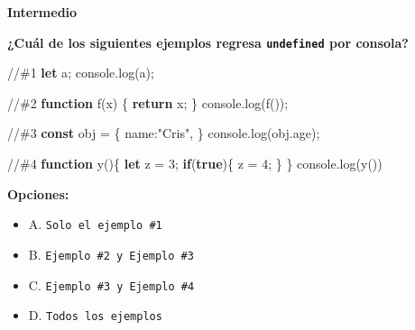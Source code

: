 \documentclass[
  letterpaper,
  DIV=11,
  numbers=noendperiod]{scrreprt}
\newenvironment{Shaded}{\begin{snugshade}}{\end{snugshade}}
\newcommand{\AttributeTok}[1]{\textcolor[rgb]{0.40,0.45,0.13}{#1}}
\newcommand{\BuiltInTok}[1]{\textcolor[rgb]{0.00,0.23,0.31}{#1}}
\newcommand{\CommentTok}[1]{\textcolor[rgb]{0.37,0.37,0.37}{#1}}
\newcommand{\ControlFlowTok}[1]{\textcolor[rgb]{0.00,0.23,0.31}{\textbf{#1}}}
\newcommand{\DataTypeTok}[1]{\textcolor[rgb]{0.68,0.00,0.00}{#1}}
\newcommand{\DecValTok}[1]{\textcolor[rgb]{0.68,0.00,0.00}{#1}}
\newcommand{\FunctionTok}[1]{\textcolor[rgb]{0.28,0.35,0.67}{#1}}
\newcommand{\KeywordTok}[1]{\textcolor[rgb]{0.00,0.23,0.31}{\textbf{#1}}}
\newcommand{\NormalTok}[1]{\textcolor[rgb]{0.00,0.23,0.31}{#1}}
\newcommand{\OperatorTok}[1]{\textcolor[rgb]{0.37,0.37,0.37}{#1}}
\newcommand{\StringTok}[1]{\textcolor[rgb]{0.13,0.47,0.30}{#1}}
\providecommand{\tightlist}{%
  \setlength{\itemsep}{0pt}\setlength{\parskip}{0pt}}
\begin{document}
\begin{tcolorbox}[enhanced jigsaw, left=2mm, toprule=.15mm, leftrule=.75mm, breakable, colback=white, coltitle=black, bottomtitle=1mm, arc=.35mm, rightrule=.15mm, colframe=quarto-callout-caution-color-frame, opacitybacktitle=0.6, toptitle=1mm, opacityback=0, titlerule=0mm, title=\textcolor{quarto-callout-caution-color}{\faFire}\hspace{0.5em}{Dificultad}, bottomrule=.15mm, colbacktitle=quarto-callout-caution-color!10!white]

\textbf{Intermedio}

\end{tcolorbox}

\textbf{¿Cuál de los siguientes ejemplos regresa \texttt{undefined} por
consola?}

\begin{Shaded}
\begin{Highlighting}[]
\CommentTok{//\#1}
\KeywordTok{let}\NormalTok{ a}\OperatorTok{;}
\BuiltInTok{console}\OperatorTok{.}\FunctionTok{log}\NormalTok{(a)}\OperatorTok{;}

\CommentTok{//\#2}
\KeywordTok{function} \FunctionTok{f}\NormalTok{(x) \{}
  \ControlFlowTok{return}\NormalTok{ x}\OperatorTok{;}
\NormalTok{\}}
\BuiltInTok{console}\OperatorTok{.}\FunctionTok{log}\NormalTok{(}\FunctionTok{f}\NormalTok{())}\OperatorTok{;}

\CommentTok{//\#3}
\KeywordTok{const}\NormalTok{ obj }\OperatorTok{=}\NormalTok{ \{}
  \DataTypeTok{name}\OperatorTok{:}\StringTok{"Cris"}\OperatorTok{,}
\NormalTok{\}}
\BuiltInTok{console}\OperatorTok{.}\FunctionTok{log}\NormalTok{(obj}\OperatorTok{.}\AttributeTok{age}\NormalTok{)}\OperatorTok{;}

\CommentTok{//\#4}
\KeywordTok{function} \FunctionTok{y}\NormalTok{()\{}
  \KeywordTok{let}\NormalTok{ z }\OperatorTok{=} \DecValTok{3}\OperatorTok{;}
  \ControlFlowTok{if}\NormalTok{(}\KeywordTok{true}\NormalTok{)\{}
\NormalTok{    z }\OperatorTok{=} \DecValTok{4}\OperatorTok{;}
\NormalTok{  \}}
\NormalTok{\}}
\BuiltInTok{console}\OperatorTok{.}\FunctionTok{log}\NormalTok{(}\FunctionTok{y}\NormalTok{())}
\end{Highlighting}
\end{Shaded}

\textbf{Opciones:}

\begin{itemize}
\tightlist
\item
  A. \texttt{Solo\ el\ ejemplo\ \#1}
\item
  B. \texttt{Ejemplo\ \#2\ y\ Ejemplo\ \#3}
\item
  C. \texttt{Ejemplo\ \#3\ y\ Ejemplo\ \#4}
\item
  D. \texttt{Todos\ los\ ejemplos}
\end{itemize}
\end{document}
